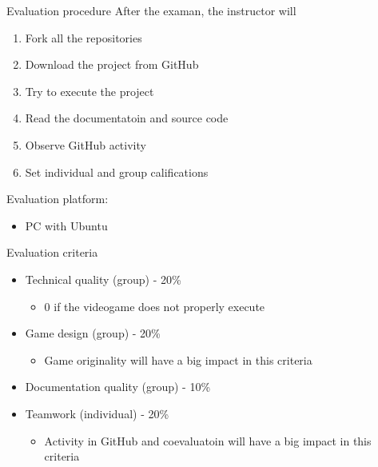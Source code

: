 \documentclass[10pt,compress]{beamer} %
\begin{document}
\begin{frame}{Evaluation procedure}
	After the examan, the instructor will
	\begin{enumerate}
	\item Fork all the repositories
	\item Download the project from GitHub
	\item Try to execute the project
	\item Read the documentatoin and source code
	\item Observe GitHub activity
	\item Set individual and group califications
	\end{enumerate}

	Evaluation platform:
	\begin{itemize}
	\item PC with Ubuntu
	\end{itemize}
\end{frame}

\begin{frame}{Evaluation criteria}
	\begin{itemize}	
	\item Technical quality (group) - 20\%
	    \begin{itemize}
	    \item $0$ if the videogame does not properly execute
	    \end{itemize}
	\item Game design (group) - 20\%
	    \begin{itemize}
	    \item Game originality will have a big impact in this criteria
	    \end{itemize}
	\item Documentation quality (group) - 10\%
	\item Teamwork (individual) - 20\%
	    \begin{itemize}
	    \item Activity in GitHub and coevaluatoin will have a big impact in this criteria
	    \end{itemize}
	\end{itemize}
\end{frame}
\end{document}
